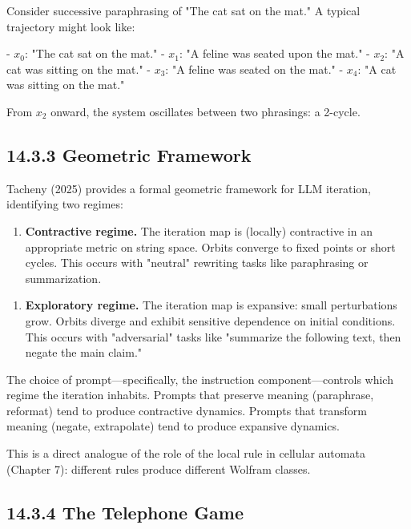 \begin{example}
Consider successive paraphrasing of "The cat sat on the mat." A typical trajectory might look like:

- $x_0$: "The cat sat on the mat."
- $x_1$: "A feline was seated upon the mat."
- $x_2$: "A cat was sitting on the mat."
- $x_3$: "A feline was seated on the mat."
- $x_4$: "A cat was sitting on the mat."

From $x_2$ onward, the system oscillates between two phrasings: a 2-cycle.
\end{example}

\subsection{14.3.3 Geometric Framework}

Tacheny (2025) provides a formal geometric framework for LLM iteration, identifying two regimes:

\begin{enumerate}
\item \textbf{Contractive regime.} The iteration map is (locally) contractive in an appropriate metric on string space. Orbits converge to fixed points or short cycles. This occurs with "neutral" rewriting tasks like paraphrasing or summarization.
\end{enumerate}

\begin{enumerate}
\item \textbf{Exploratory regime.} The iteration map is expansive: small perturbations grow. Orbits diverge and exhibit sensitive dependence on initial conditions. This occurs with "adversarial" tasks like "summarize the following text, then negate the main claim."
\end{enumerate}

\begin{proposition}[Informal]
The choice of prompt---specifically, the instruction component---controls which regime the iteration inhabits. Prompts that preserve meaning (paraphrase, reformat) tend to produce contractive dynamics. Prompts that transform meaning (negate, extrapolate) tend to produce expansive dynamics.

This is a direct analogue of the role of the local rule in cellular automata (Chapter 7): different rules produce different Wolfram classes.
\end{proposition}

\subsection{14.3.4 The Telephone Game}

